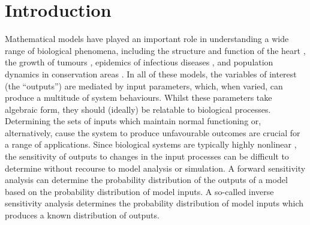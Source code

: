 \documentclass[10pt,letterpaper]{article}
\begin{document}

\section{Introduction}
\label{sec:inverse_sensitivity}

Mathematical models have played an important role in understanding a wide range of biological phenomena, including the structure and function of the heart \cite{nielsen1991mathematical,noble2004modeling}, the growth of tumours \cite{byrne2006modelling,byrne2010dissecting}, epidemics of infectious diseases \cite{anderson1992infectious}, and population dynamics in conservation areas \cite{morris2002quantitative,hanski2001spatially}. In all of these models, the variables of interest (the ``outputs'') are mediated by input parameters, which, when varied, can produce a multitude of system behaviours. Whilst these parameters take algebraic  form, they should (ideally) be relatable to biological processes. Determining the sets of inputs which maintain normal functioning or, alternatively, cause the system to produce unfavourable outcomes are crucial for a range of applications. Since biological systems are typically highly nonlinear \cite{murray2007mathematical}, the sensitivity of outputs to changes in the input processes can be difficult to determine without recourse to model analysis or simulation. A forward sensitivity analysis can determine the probability distribution of the outputs of a model based on the probability distribution of model inputs. A so-called inverse sensitivity analysis determines the probability distribution of model inputs which produces a known distribution of outputs.
\end{document}
